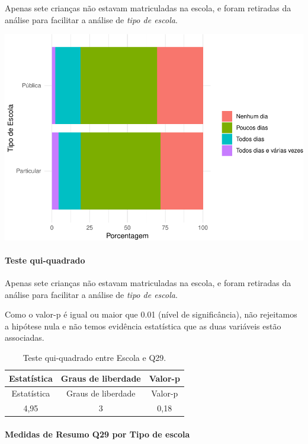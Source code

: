 \documentclass[]{article}
\let\oldparagraph\paragraph
\renewcommand{\paragraph}[1]{\oldparagraph{#1}\mbox{}}
\begin{document}
Apenas sete crianças não estavam matriculadas na escola, e foram retiradas da análise para facilitar a análise de \emph{tipo de escola}.

\begin{center}\includegraphics[width=0.75\linewidth]{relatorio_covid19_files/figure-latex/unnamed-chunk-939-1} \end{center}

\hypertarget{teste-qui-quadrado-81}{%
\paragraph{Teste qui-quadrado}\label{teste-qui-quadrado-81}}

Apenas sete crianças não estavam matriculadas na escola, e foram retiradas da análise para facilitar a análise de \emph{tipo de escola}.

Como o valor-p é igual ou maior que 0.01 (nível de significância), não rejeitamos a hipótese nula e não temos evidência estatística que as duas variáveis estão associadas.

\begin{longtable}[]{@{}ccc@{}}
\caption{\label{tab:unnamed-chunk-941}Teste qui-quadrado entre Escola e Q29.}\tabularnewline
\toprule
Estatística & Graus de liberdade & Valor-p\tabularnewline
\midrule
\endfirsthead
\toprule
Estatística & Graus de liberdade & Valor-p\tabularnewline
\midrule
\endhead
4,95 & 3 & 0,18\tabularnewline
\bottomrule
\end{longtable}

\cleardoublepage

\hypertarget{medidas-de-resumo-q29-por-tipo-de-escola}{%
\paragraph{Medidas de Resumo Q29 por Tipo de escola}\label{medidas-de-resumo-q29-por-tipo-de-escola}}
\end{document}
